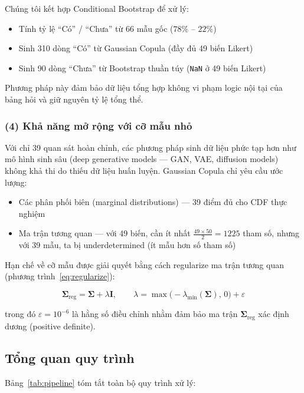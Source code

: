 \documentclass[12pt,a4paper]{article}
\begin{document}
Chúng tôi kết hợp Conditional Bootstrap để xử lý:
\begin{itemize}
    \item Tính tỷ lệ ``Có'' / ``Chưa'' từ 66 mẫu gốc ($78\%$ -- $22\%$)
    \item Sinh 310 dòng ``Có'' từ Gaussian Copula (đầy đủ 49 biến Likert)
    \item Sinh 90 dòng ``Chưa'' từ Bootstrap thuần túy (\texttt{NaN} ở 49 biến Likert)
\end{itemize}

Phương pháp này đảm bảo dữ liệu tổng hợp không vi phạm logic 
nội tại của bảng hỏi và giữ nguyên tỷ lệ tổng thể.

\subsubsection{(4) Khả năng mở rộng với cỡ mẫu nhỏ}

Với chỉ 39 quan sát hoàn chỉnh, các phương pháp sinh dữ liệu 
phức tạp hơn như mô hình sinh sâu (deep generative models — 
GAN, VAE, diffusion models) không khả thi do thiếu dữ liệu huấn luyện. 
Gaussian Copula chỉ yêu cầu ước lượng:
\begin{itemize}
    \item Các phân phối biên (marginal distributions) — 39 điểm đủ cho CDF thực nghiệm
    \item Ma trận tương quan — với 49 biến, cần ít nhất 
    $\frac{49 \times 50}{2} = 1225$ tham số, nhưng với 39 mẫu, 
    ta bị underdetermined (ít mẫu hơn số tham số)
\end{itemize}

Hạn chế về cỡ mẫu được giải quyết bằng cách regularize ma trận tương quan 
(phương trình~\ref{eq:regularize}):

\begin{equation}
    \bm{\Sigma}_{\text{reg}} = \bm{\Sigma} + \lambda \bm{I}, 
    \qquad \lambda = \max\!\bigl(-\lambda_{\min}(\bm{\Sigma}),\,0\bigr) + \varepsilon
    \label{eq:regularize}
\end{equation}

trong đó $\varepsilon = 10^{-6}$ là hằng số điều chỉnh nhằm đảm bảo 
ma trận $\bm{\Sigma}_{\text{reg}}$ xác định dương (positive definite).

\subsection{Tổng quan quy trình}

Bảng~\ref{tab:pipeline} tóm tắt toàn bộ quy trình xử lý:
\end{document}
